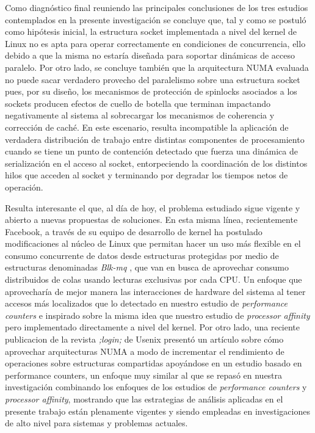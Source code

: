 \begin{conclusion}
 
Como diagnóstico final reuniendo las principales conclusiones de los tres estudios contemplados en la presente investigación se concluye que, tal y como se postuló como hipótesis inicial, la estructura socket implementada a nivel del kernel de Linux no es apta para operar correctamente en condiciones de concurrencia, ello debido a que la misma no estaría diseñada para soportar dinámicas de acceso paralelo. Por otro lado, se concluye también que la arquitectura NUMA evaluada no puede sacar verdadero provecho del paralelismo sobre una estructura socket pues, por su diseño, los mecanismos de protección de spinlocks asociados a los sockets producen efectos de cuello de botella que terminan impactando negativamente al sistema al sobrecargar los mecanismos de coherencia y corrección de caché. En este escenario, resulta incompatible la aplicación de verdadera distribución de trabajo entre distintas componentes de procesamiento cuando se tiene un punto de contención detectado que fuerza una dinámica de serialización en el acceso al socket, entorpeciendo la coordinación de los distintos hilos que acceden al socket y terminando por degradar los tiempos netos de operación. 
 
 
Resulta interesante el que, al día de hoy, el problema estudiado sigue vigente y abierto a nuevas propuestas de soluciones. En esta misma línea, recientemente Facebook, a través de su equipo de desarrollo de kernel ha postulado modificaciones al núcleo de Linux que permitan hacer un uso más flexible en el consumo concurrente de datos desde estructuras protegidas por medio de estructuras denominadas \emph{Blk-mq} \cite{post:facebookFin}, que van en busca de aprovechar consumo distribuidos de colas usando lecturas exclusivas por cada CPU. Un enfoque que aprovecharía de mejor manera las interacciones de hardware del sistema al tener accesos más localizados que lo detectado en nuestro estudio de \emph{performance counters} e inspirado sobre la misma idea que nuestro estudio de \emph{processor affinity} pero implementado directamente a nivel del kernel. Por otro lado, una reciente publicacion de la revista \emph{;login;} de Usenix \cite{magazine:login} presentó un artículo sobre cómo aprovechar arquitecturas NUMA a modo de incrementar el rendimiento de operaciones sobre estructuras compartidas apoyándose en un estudio basado en performance counters, un enfoque muy similar al que se repasó en nuestra investigación combinando los enfoques de los estudios de \emph{performance counters} y \emph{processor affinity}, mostrando que las estrategias de análisis aplicadas en el presente trabajo están plenamente vigentes y siendo empleadas en investigaciones de alto nivel para sistemas y problemas actuales. 
 

\end{conclusion}

